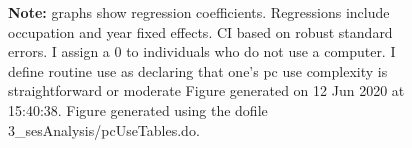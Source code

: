 \begin{figure}[!h]
\par \begin{minipage}[h]{\textwidth}{\scriptsize\textbf{Note:} graphs show regression coefficients. Regressions include occupation and year fixed effects. CI based on robust standard errors. I assign a 0 to individuals who do not use a computer. I define routine use as declaring that one's pc use complexity is straightforward or moderate Figure generated on 12 Jun 2020 at 15:40:38. Figure generated using the dofile 3\_sesAnalysis/pcUseTables.do.}\end{minipage}
\end{figure}

